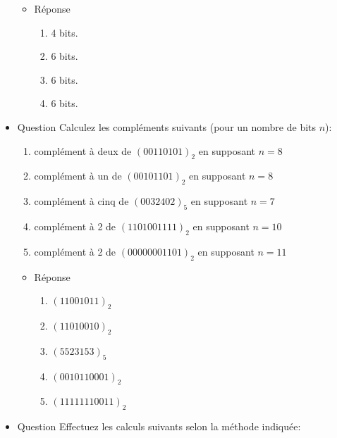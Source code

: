 \documentclass[letter, oneside]{book}
\begin{document}
\begin{itemize}
\begin{itemize}
\item Réponse
\label{sec:org875f94c}
\begin{enumerate}
\item 4 bits.
\item 6 bits.
\item 6 bits.
\item 6 bits.
\end{enumerate}
\end{itemize}

\item Question
\label{sec:orga272be7}
Calculez les compléments suivants (pour un nombre de bits \(n\)):

\begin{enumerate}
\item complément à deux de \((00110101)_2\) en supposant \(n=8\)

\item complément à un de \((00101101)_2\) en supposant \(n=8\)

\item complément à cinq de \((0032402)_5\) en supposant \(n=7\)

\item complément à 2 de \((1101001111)_2\) en supposant \(n=10\)

\item complément à 2 de \((00000001101)_2\) en supposant \(n=11\)
\end{enumerate}

\begin{itemize}
\item Réponse
\label{sec:orgdddcf6e}

\begin{enumerate}
\item \((11001011)_2\)

\item \((11010010)_2\)

\item \((5523153)_{5}\)

\item \((0010110001)_2\)

\item \((11111110011)_2\)
\end{enumerate}
\end{itemize}

\item Question
\label{sec:orgbb1d096}
Effectuez les calculs suivants selon la méthode indiquée:


\end{itemize}
\end{document}
